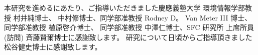 \begin{acknowledgment}

本研究を進めるにあたり、ご指導いただきました慶應義塾大学 環境情報学部教授 村井純博士、
中村修博士、同学部准教授 Rodney D。 Van Meter III 博士、同学部准教授 植原啓介博士、
同学部准教授 中澤仁博士、SFC 研究所 上席所員 (訪問) 斉藤賢爾博士に感謝致します。
研究について日頃からご指導頂きました松谷健史博士に感謝致します。

\end{acknowledgment}
